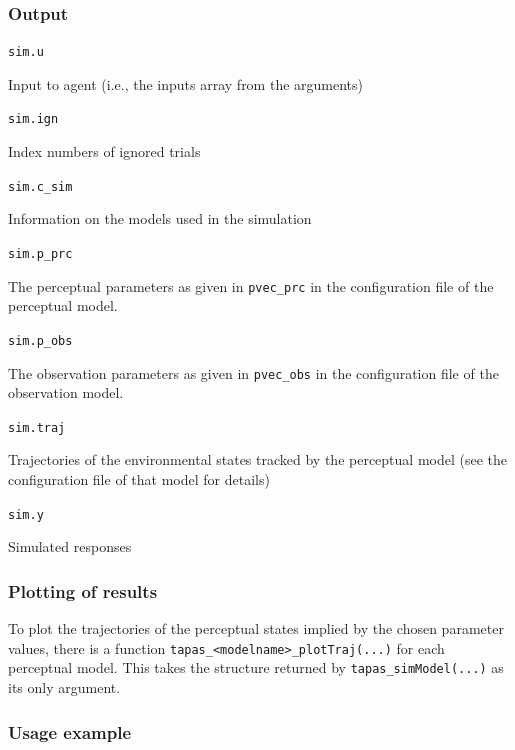 \documentclass[11pt,a4paper]{article}
\numberwithin{equation}{section}
\begin{document}
\subsubsection{Output}

\begin{description}
  \item{\texttt{sim.u}}

    Input to agent (i.e., the inputs array from the arguments)

\item{\texttt{sim.ign}}

  Index numbers of ignored trials

\item{\texttt{sim.c\_sim}}

  Information on the models used in the simulation

\item{\texttt{sim.p\_prc}}

  The perceptual parameters as given in \texttt{pvec\_prc} in the
  configuration file of the perceptual model.

\item{\texttt{sim.p\_obs}}

  The observation parameters as given in \texttt{pvec\_obs} in the
  configuration file of the observation model.

\item{\texttt{sim.traj}}

  Trajectories of the environmental states tracked by the perceptual
  model (see the configuration file of that model for details)

\item{\texttt{sim.y}}

  Simulated responses
\end{description}

\subsubsection{Plotting of results}

To plot the trajectories of the perceptual states implied by the
chosen parameter values, there is a function
\texttt{tapas\_<modelname>\_plotTraj(...)}  for each perceptual
model. This takes the structure returned by
\texttt{tapas\_simModel(...)} as its only argument.

\subsubsection{Usage example}
\end{document}
